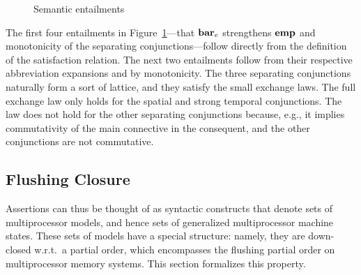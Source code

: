 \documentclass[11pt]{report}
\begin{document}
\begin{figure}[ht]
	\centering
	\caption{\label{fig:entailments}Semantic entailments}
\end{figure}

The first four entailments in Figure~\ref{fig:entailments}---that $\mathbf{bar}_{e}$ strengthens $\mathbf{emp}$ and monotonicity of the separating conjunctions---follow directly from the definition of the satisfaction relation. The next two entailments follow from their respective abbreviation expansions and by monotonicity. The three separating conjunctions naturally form a sort of lattice, and they satisfy the small exchange laws. The full exchange law only holds for the spatial and strong temporal conjunctions. The law does not hold for the other separating conjunctions because, e.g., it implies commutativity of the main connective in the consequent, and the other conjunctions are not commutative. 

\subsection{Flushing Closure}
\label{sec:predicates}

Assertions can thus be thought of as syntactic constructs that denote sets of multiprocessor models, and hence sets of generalized multiprocessor machine states. These sets of models have a special structure: namely, they are down-closed w.r.t.\ a partial order, which encompasses the flushing partial order on multiprocessor memory systems. This section formalizes this property. 
\end{document}
